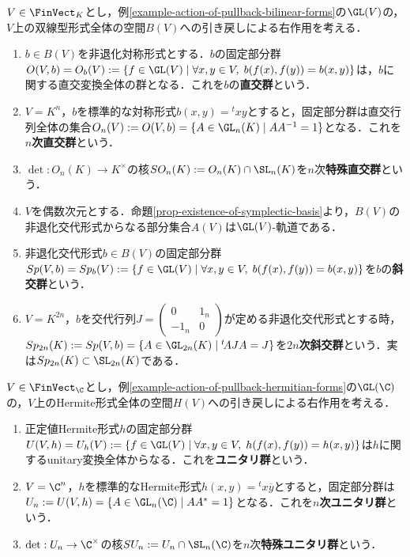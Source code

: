 \documentclass[uplatex, dvipdfmx]{jsreport}
\begin{document}
\begin{example}
    $V\in\FinVect_K$とし，例\ref{example-action-of-pullback-bilinear-forms}の$\GL(V)$の，$V$上の双線型形式全体の空間$B(V)$への引き戻しによる右作用を考える．
    \begin{enumerate}
        \item $b\in B(V)$を非退化対称形式とする．$b$の固定部分群$O(V,b)=O_b(V):=\{f\in\GL(V)\mid \forall x,y\in V,\;b(f(x),f(y))=b(x,y)\}$は，$b$に関する直交変換全体の群となる．これを$b$の\textbf{直交群}という．
        \item $V=K^n$，$b$を標準的な対称形式$b(x,y)={}^t\!xy$とすると，固定部分群は直交行列全体の集合$O_n(V):=O(V,b)=\{A\in\GL_n(K)\mid AA^{-1}=1\}$となる．これを\textbf{$n$次直交群}という．
        \item $\det:O_n(K)\to K^\times$の核$SO_n(K):=O_n(K)\cap\SL_n(K)$を$n$次\textbf{特殊直交群}という．
        \item $V$を偶数次元とする．命題\ref{prop-existence-of-symplectic-basis}より，$B(V)$の非退化交代形式からなる部分集合$A(V)$は$\GL(V)$-軌道である．
        \item 非退化交代形式$b\in B(V)$の固定部分群$Sp(V,b)=Sp_b(V):=\{f\in\GL(V)\mid \forall x,y\in V,\;b(f(x),f(y))=b(x,y)\}$を$b$の\textbf{斜交群}という．
        \item $V=K^{2n}$，$b$を交代行列$J=\begin{pmatrix}0&1_n\\-1_n&0\end{pmatrix}$が定める非退化交代形式とする時，$Sp_{2n}(K):=Sp(V,b)=\{A\in\GL_{2n}(K)\mid {}^t\!AJA=J\}$を\textbf{$2n$次斜交群}という．実は$Sp_{2n}(K)\subset\SL_{2n}(K)$である．
    \end{enumerate}
\end{example}

\begin{example}
    $V\in\FinVect_\C$とし，例\ref{example-action-of-pullback-hermitian-forms}の$\GL(\C)$の，$V$上のHermite形式全体の空間$H(V)$への引き戻しによる右作用を考える．
    \begin{enumerate}
        \item 正定値Hermite形式$h$の固定部分群$U(V,h)=U_h(V):=\{f\in\GL(V)\mid\forall x,y\in V,\;h(f(x),f(y))=h(x,y)\}$は$h$に関するunitary変換全体からなる．これを\textbf{ユニタリ群}という．
        \item $V=\C^n$，$h$を標準的なHermite形式$h(x,y)={}^t\!x\overline{y}$とすると，固定部分群は$U_n:=U(V,h)=\{A\in\GL_n(\C)\mid AA^*=1\}$となる．これを\textbf{$n$次ユニタリ群}という．
        \item $\det:U_n\to\C^\times$の核$SU_n:=U_n\cap\SL_n(\C)$を$n$次\textbf{特殊ユニタリ群}という．
    \end{enumerate}
\end{example}
\end{document}
